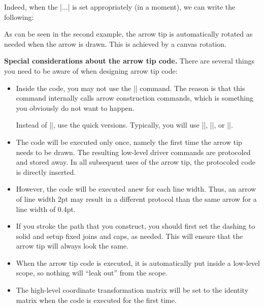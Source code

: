 \begin{command}{\pgfarrowsdeclare{}}
  Indeed, when the |...| is set appropriately (in a moment), we can
  write the following:
{
  \pgfsetdash{}{0pt} %
  \pgfsetroundjoin   %
  \pgfsetroundcap    %
  \pgfpathmoveto{\pgfpoint{-10pt}{10pt}}
  \pgfusepathqstroke
}
\begin{codeexample}[]
\end{codeexample}

  As can be seen in the second example, the arrow tip is automatically
  rotated as needed when the arrow is drawn. This is achieved by a
  canvas rotation.

  \medskip
  \textbf{Special considerations about the arrow tip code.}
  There are several things you need to be aware of when designing
  arrow tip code:
  \begin{itemize}
  \item
    Inside the code, you may not use the |\pgfusepath|
    command. The reason is that this command internally calls arrow
    construction commands, which is something you obviously do not want
    to happen.

    Instead of |\pgfusepath|, use the quick versions. Typically, you
    will use |\pgfusepathqstroke|, |\pgfusepathqfill|, or
    |\pgfusepathqfillstroke|.
  \item
    The code will be executed only once, namely the first time the
    arrow tip needs to be drawn. The resulting low-level driver
    commands are protocoled and stored away. In all subsequent 
    uses of the arrow tip, the protocoled code is directly inserted.
  \item
    However, the code will be executed anew for each line width. Thus,
    an arrow of line width 2pt may result in a different protocol than
    the same arrow for a line width of 0.4pt.
  \item
    If you stroke the path that you construct, you should first set
    the dashing to solid and setup fixed joins and caps, as
    needed. This will ensure that the arrow tip will always look the
    same.
  \item
    When the arrow tip code is executed, it is automatically put
    inside a low-level scope, so nothing will ``leak out'' from the
    scope.
  \item
    The high-level coordinate transformation matrix will be set to the
    identity matrix when the code is executed for the first time.
  \end{itemize}


\end{command}
